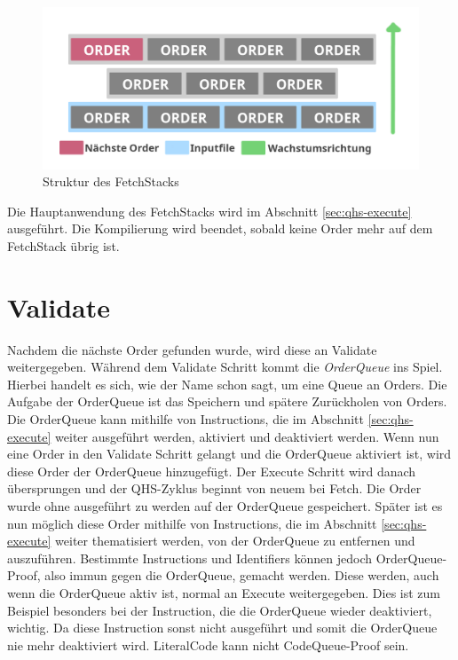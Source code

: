 \begin{figure}[h!]
    \centering
    \includegraphics[scale=1.1]{resources/images/fetch-stack.png}
    \caption{Struktur des FetchStacks}
    \label{fig:fetchstack}
\end{figure}

Die Hauptanwendung des FetchStacks wird im Abschnitt \ref{sec:qhs-execute} ausgeführt.
Die Kompilierung wird beendet, sobald keine Order mehr auf dem FetchStack übrig ist.

\section{Validate} \label{sec:qhs-Validate}
Nachdem die nächste Order gefunden wurde, wird diese an Validate weitergegeben. Während dem Validate Schritt kommt die \textit{OrderQueue} ins Spiel. Hierbei handelt es sich, wie der Name schon sagt, um eine Queue an Orders.
Die Aufgabe der OrderQueue ist das Speichern und spätere Zurückholen von Orders. Die OrderQueue kann mithilfe von Instructions, die im Abschnitt \ref{sec:qhs-execute} weiter ausgeführt werden, aktiviert und deaktiviert werden.
Wenn nun eine Order in den Validate Schritt gelangt und die OrderQueue aktiviert ist, wird diese Order der OrderQueue hinzugefügt. Der Execute Schritt wird danach übersprungen und der QHS-Zyklus beginnt von neuem bei Fetch.
Die Order wurde ohne ausgeführt zu werden auf der OrderQueue gespeichert. Später ist es nun möglich diese Order mithilfe von Instructions, die im Abschnitt \ref{sec:qhs-execute} weiter thematisiert werden, 
von der OrderQueue zu entfernen und auszuführen. Bestimmte Instructions und Identifiers können jedoch OrderQueue-Proof, also immun gegen die OrderQueue, gemacht werden. Diese werden, auch wenn die OrderQueue aktiv ist, 
normal an Execute weitergegeben. Dies ist zum Beispiel besonders bei der Instruction, die die OrderQueue wieder deaktiviert, wichtig. Da diese Instruction sonst nicht ausgeführt und somit die OrderQueue nie mehr deaktiviert wird.
LiteralCode kann nicht CodeQueue-Proof sein.

